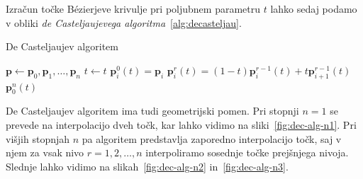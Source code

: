 \documentclass[isrm2, tisk]{fmfdelo}
\newcommand{\p}{\mathbf{p}}
\begin{document}
    \noindent Izračun točke Bézierjeve krivulje pri poljubnem parametru $t$ lahko sedaj podamo v obliki \textit{de Casteljaujevega algoritma}~\ref{alg:decasteljau}.
    \begin{algorithm}[H]
        \caption{De Casteljaujev algoritem}
        \label{alg:decasteljau}
        \begin{algorithmic}
            \State $\p \gets \p_0,\p_1,\dots,\p_n$
            \State $t \gets t$
                \State $\p_i^0(t)=\p_i$
            \EndFor
                    \State $\p_i^r(t)=(1-t)\p_i^{r-1}(t)+t\p_{i+1}^{r-1}(t)$
                \EndFor
            \EndFor
            \State \Return $\p_0^n(t)$
        \end{algorithmic}
    \end{algorithm}
    \noindent De Casteljaujev algoritem ima tudi geometrijski pomen.
    Pri stopnji $n=1$ se prevede na interpolacijo dveh točk, kar lahko vidimo na sliki~\ref{fig:dec-alg-n1}.
    Pri višjih stopnjah $n$ pa algoritem predstavlja zaporedno interpolacijo točk, saj v njem za vsak nivo $r=1,2,\ldots,n$ interpoliramo sosednje točke prejšnjega nivoja.
    Slednje lahko vidimo na slikah~\ref{fig:dec-alg-n2} in~\ref{fig:dec-alg-n3}.
\end{document}
